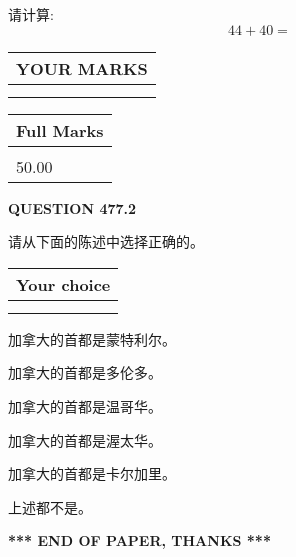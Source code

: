 \documentclass{ctexart}
\begin{document}
  
 
请计算:
\begin{equation}
44 +  %
40 = \nonumber
\end{equation}
 

 

 
  
\vspace{0.2in}
  
\noindent\begin{tabular}{|l|}
\hline
 YOUR MARKS  \\
\hline
 \\ 
 \\ 
\hline
\end{tabular}
\hspace{0.05in} \begin{tabular}{|l|}
\hline
 Full Marks  \\
\hline
 \\ 
50.00 \\
\hline
\end{tabular}
{\textbf{\Large{QUESTION
477.2 
}}}
  
  
请从下面的陈述中选择正确的。
  
  
\noindent\hspace{3.0in} \begin{tabular}{|l|}
\hline
Your choice \\
\hline
 \\ 
 \\ 
\hline
\end{tabular}
  
  
 
 
加拿大的首都是蒙特利尔。
 
 
加拿大的首都是多伦多。
 
 
加拿大的首都是温哥华。
 
 
加拿大的首都是渥太华。
 
 
加拿大的首都是卡尔加里。
 
 
 上述都不是。
 
 
   
   
 \vspace{0.2in}
 
   
   
   
   
\vspace{1.0in} 
{\textbf{\large{ *** END OF PAPER, THANKS *** }}} 
   
\end{document}
